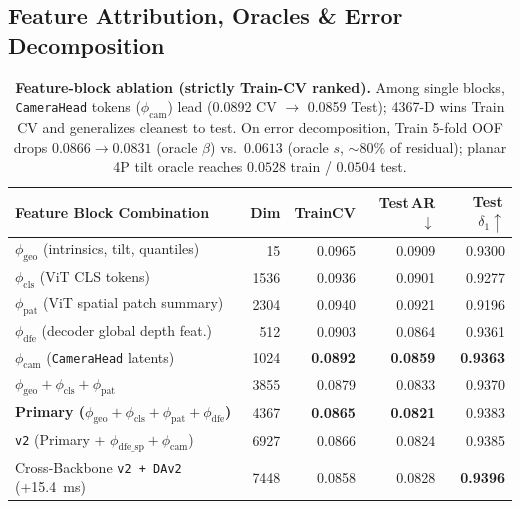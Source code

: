\documentclass[10pt,twocolumn,letterpaper]{article}
\begin{document}
\subsection{Feature Attribution, Oracles \& Error Decomposition}
\begin{table}[t]
\centering
\scriptsize
\setlength{\tabcolsep}{2.2pt}
\begin{tabular}{@{}lrrrr@{}}
\toprule
Feature Block Combination & Dim & TrainCV & Test\,AR$\downarrow$ & Test\,$\delta_1\uparrow$ \\
\midrule
$\phi_{\text{geo}}$ (intrinsics, tilt, quantiles) & 15   & 0.0965 & 0.0909 & 0.9300 \\
$\phi_{\text{cls}}$ (ViT CLS tokens)              & 1536 & 0.0936 & 0.0901 & 0.9277 \\
$\phi_{\text{pat}}$ (ViT spatial patch summary)   & 2304 & 0.0940 & 0.0921 & 0.9196 \\
$\phi_{\text{dfe}}$ (decoder global depth feat.)  & 512  & 0.0903 & 0.0864 & 0.9361 \\
$\phi_{\text{cam}}$ (\texttt{CameraHead} latents) & 1024 & \textbf{0.0892} & \textbf{0.0859} & \textbf{0.9363} \\
$\phi_{\text{geo}}+\phi_{\text{cls}}+\phi_{\text{pat}}$ & 3855 & 0.0879 & 0.0833 & 0.9370 \\
\textbf{Primary ($\phi_{\text{geo}}+\phi_{\text{cls}}+\phi_{\text{pat}}+\phi_{\text{dfe}}$)} & 4367 & \textbf{0.0865} & \textbf{0.0821} & 0.9383 \\
\texttt{v2} (Primary + $\phi_{\text{dfe\_sp}}+\phi_{\text{cam}}$) & 6927 & 0.0866 & 0.0824 & 0.9385 \\
Cross-Backbone \texttt{v2 + DAv2} (+15.4~ms)      & 7448 & 0.0858 & 0.0828 & \textbf{0.9396} \\
\bottomrule
\end{tabular}
\vspace{-0.3em}
\caption{\textbf{Feature-block ablation (strictly Train-CV ranked).} Among single blocks, \texttt{CameraHead} tokens ($\phi_{\text{cam}}$) lead (0.0892 CV $\to$ 0.0859 Test); 4367-D wins Train CV and generalizes cleanest to test. On error decomposition, Train 5-fold OOF drops $0.0866\to 0.0831$ (oracle $\beta$) vs.\ $\mathbf{0.0613}$ (oracle $s$, $\sim 80\%$ of residual); planar 4P tilt oracle reaches $0.0528$ train / $\mathbf{0.0504}$ test.}
\label{tab:feat_decomp}
\vspace{-0.7em}
\end{table}
\end{document}
